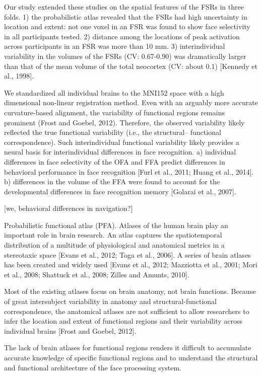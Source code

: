 %
Our study extended these studies on the spatial features of the FSRs in three
folds.
%
1) the probabilistic atlas revealed that the FSRs had high uncertainty in
location and extent:
%
not one voxel in an FSR was found to show face selectivity in all participants
tested.
%
2) distance among the locations of peak activation across participants
in an FSR was more than 10 mm.
%
3) interindividual variability in the volumes of the FSRs (CV: 0.67-0.90)
was dramatically larger than that of the mean volume of the total neocortex (CV:
about 0.1) [Kennedy et al., 1998].

We standardized all individual brains to the MNI152 space with a
high dimensional non-linear registration method.
%
Even with an arguably more accurate curvature-based alignment, the
variability of functional regions remains prominent (Frost and Goebel, 2012).
%
Therefore, the observed variability likely reflected the true functional
variability (i.e., the structural– functional correspondence).
%
Such interindividual functional variability likely provides a neural basis for
interindividual differences in face recognition.
%
a) individual differences in face selectivity of the OFA and FFA
predict differences in behavioral performance in face recognition [Furl et al.,
2011; Huang et al., 2014].
%
b) differences in the volume of the FFA were found to account for the
developmental differences in face recognition memory [Golarai et al., 2007].

[we, behavioral differences in navigation?]


Probabilistic functional atlas (PFA).
%
Atlases of the human brain play an important role in brain research.
%
An atlas captures the spatiotemporal distribution of a multitude of
physiological and anatomical metrics in a stereotaxic space [Evans et al., 2012;
Toga et al., 2006].
%
A series of brain atlases has been created and widely used [Evans et al., 2012;
Mazziotta et al., 2001; Mori et al., 2008; Shattuck et al., 2008; Zilles and
Amunts, 2010].

%
Most of the existing atlases focus on brain anatomy, not brain
functions.
%
Because of great intersubject variability in anatomy and structural-functional
correspondence, the anatomical atlases are not sufficient to allow researchers
to infer the location and extent of functional regions and their variability
across individual brains [Frost and Goebel, 2012].

%
The lack of brain atlases for functional regions renders it difficult to
accumulate accurate knowledge of specific functional regions and to understand
the structural and functional architecture of the face processing system.

